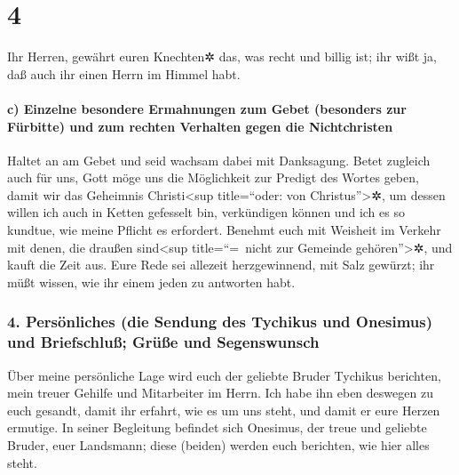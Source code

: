 \hypertarget{section-3}{%
\section{4}\label{section-3}}

 Ihr Herren, gewährt euren Knechten✲ das, was recht und
billig ist; ihr wißt ja, daß auch ihr einen Herrn im Himmel habt.

\hypertarget{c-einzelne-besondere-ermahnungen-zum-gebet-besonders-zur-fuxfcrbitte-und-zum-rechten-verhalten-gegen-die-nichtchristen}{%
\paragraph{c) Einzelne besondere Ermahnungen zum Gebet (besonders zur
Fürbitte) und zum rechten Verhalten gegen die
Nichtchristen}\label{c-einzelne-besondere-ermahnungen-zum-gebet-besonders-zur-fuxfcrbitte-und-zum-rechten-verhalten-gegen-die-nichtchristen}}

 Haltet an am Gebet und seid wachsam dabei mit Danksagung.
 Betet zugleich auch für uns, Gott möge uns die
Möglichkeit zur Predigt des Wortes geben, damit wir das Geheimnis
Christi\textless sup title=``oder: von Christus''\textgreater✲, um
dessen willen ich auch in Ketten gefesselt bin, verkündigen können
 und ich es so kundtue, wie meine Pflicht es erfordert.
 Benehmt euch mit Weisheit im Verkehr mit denen, die
draußen sind\textless sup title=``=~nicht zur Gemeinde
gehören''\textgreater✲, und kauft die Zeit aus.  Eure Rede
sei allezeit herzgewinnend, mit Salz gewürzt; ihr müßt wissen, wie ihr
einem jeden zu antworten habt.

\hypertarget{persuxf6nliches-die-sendung-des-tychikus-und-onesimus-und-briefschluuxdf-gruxfcuxdfe-und-segenswunsch}{%
\subsubsection{4. Persönliches (die Sendung des Tychikus und Onesimus)
und Briefschluß; Grüße und
Segenswunsch}\label{persuxf6nliches-die-sendung-des-tychikus-und-onesimus-und-briefschluuxdf-gruxfcuxdfe-und-segenswunsch}}

 Über meine persönliche Lage wird euch der geliebte Bruder
Tychikus berichten, mein treuer Gehilfe und Mitarbeiter im Herrn.
 Ich habe ihn eben deswegen zu euch gesandt, damit ihr
erfahrt, wie es um uns steht, und damit er eure Herzen ermutige.
 In seiner Begleitung befindet sich Onesimus, der treue
und geliebte Bruder, euer Landsmann; diese (beiden) werden euch
berichten, wie hier alles steht.

